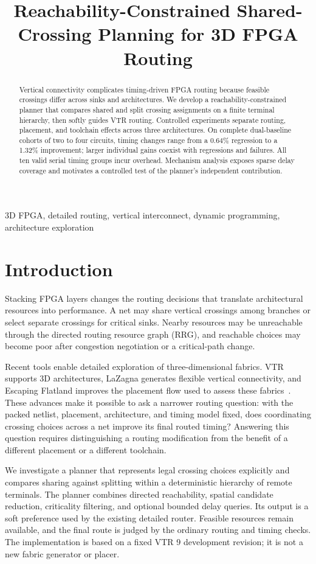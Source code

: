 \documentclass[conference,10pt]{IEEEtran}
\title{Reachability-Constrained Shared-Crossing Planning for 3D FPGA Routing}
\author{\IEEEauthorblockN{Anonymous submission draft}}
\begin{document}
\maketitle
\begin{abstract}
Vertical connectivity complicates timing-driven FPGA routing because feasible crossings differ across sinks and architectures. We develop a reachability-constrained planner that compares shared and split crossing assignments on a finite terminal hierarchy, then softly guides VTR routing. Controlled experiments separate routing, placement, and toolchain effects across three architectures. On complete dual-baseline cohorts of two to four circuits, timing changes range from a 0.64\% regression to a 1.32\% improvement; larger individual gains coexist with regressions and failures. All ten valid serial timing groups incur overhead. Mechanism analysis exposes sparse delay coverage and motivates a controlled test of the planner's independent contribution.
\end{abstract}
\begin{IEEEkeywords}
3D FPGA, detailed routing, vertical interconnect, dynamic programming, architecture exploration
\end{IEEEkeywords}

\section{Introduction}
Stacking FPGA layers changes the routing decisions that translate architectural resources into performance. A net may share vertical crossings among branches or select separate crossings for critical sinks. Nearby resources may be unreachable through the directed routing resource graph (RRG), and reachable choices may become poor after congestion negotiation or a critical-path change.

Recent tools enable detailed exploration of three-dimensional fabrics. VTR supports 3D architectures, LaZagna generates flexible vertical connectivity, and Escaping Flatland improves the placement flow used to assess these fabrics~\cite{vtr9,vtr9paper,lazagna,flatland}. These advances make it possible to ask a narrower routing question: with the packed netlist, placement, architecture, and timing model fixed, does coordinating crossing choices across a net improve its final routed timing? Answering this question requires distinguishing a routing modification from the benefit of a different placement or a different toolchain.

We investigate a planner that represents legal crossing choices explicitly and compares sharing against splitting within a deterministic hierarchy of remote terminals. The planner combines directed reachability, spatial candidate reduction, criticality filtering, and optional bounded delay queries. Its output is a soft preference used by the existing detailed router. Feasible resources remain available, and the final route is judged by the ordinary routing and timing checks. The implementation is based on a fixed VTR 9 development revision; it is not a new fabric generator or placer.
\end{document}
